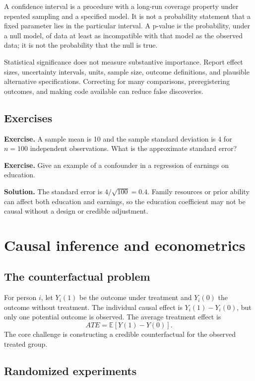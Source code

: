 \documentclass[11pt,oneside,openany]{book}
\newcommand{\E}{\mathbb{E}}
\newcommand{\exercise}[1]{\textbf{Exercise.} #1}
\newcommand{\solution}[1]{\textbf{Solution.} #1}
\begin{document}
A confidence interval is a procedure with a long-run coverage property under repeated sampling and a specified model. It is not a probability statement that a fixed parameter lies in the particular interval. A p-value is the probability, under a null model, of data at least as incompatible with that model as the observed data; it is not the probability that the null is true.

Statistical significance does not measure substantive importance. Report effect sizes, uncertainty intervals, units, sample size, outcome definitions, and plausible alternative specifications. Correcting for many comparisons, preregistering outcomes, and making code available can reduce false discoveries.

\section{Exercises}

\exercise{A sample mean is 10 and the sample standard deviation is 4 for $n=100$ independent observations. What is the approximate standard error?}

\exercise{Give an example of a confounder in a regression of earnings on education.}

\solution{The standard error is $4/\sqrt{100}=0.4$. Family resources or prior ability can affect both education and earnings, so the education coefficient may not be causal without a design or credible adjustment.}

\chapter{Causal inference and econometrics}
\label{ch:causal}

\section{The counterfactual problem}

For person $i$, let $Y_i(1)$ be the outcome under treatment and $Y_i(0)$ the outcome without treatment. The individual causal effect is $Y_i(1)-Y_i(0)$, but only one potential outcome is observed. The average treatment effect is
\[
  ATE=\E[Y(1)-Y(0)].
\]
The core challenge is constructing a credible counterfactual for the observed treated group.

\section{Randomized experiments}
\end{document}
